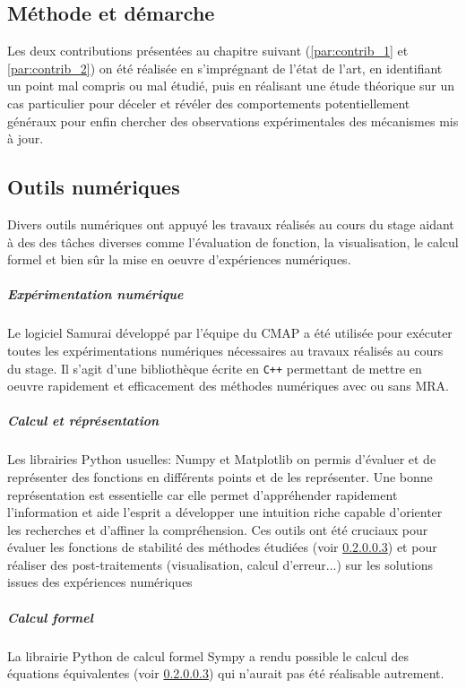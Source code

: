 \subsection{Méthode et démarche}
    Les deux contributions présentées au chapitre suivant (\ref{par:contrib_1} et \ref{par:contrib_2}) on été réalisée 
    en s'imprégnant de l'état de l'art, en identifiant un point mal compris ou mal étudié, puis
    en réalisant une étude théorique sur un cas particulier pour déceler et révéler des comportements potentiellement généraux
    pour enfin chercher des observations expérimentales des mécanismes mis à jour.
\subsection{Outils numériques}
    Divers outils numériques ont appuyé les travaux réalisés au cours du stage aidant à des des tâches diverses comme 
    l'évaluation de fonction, la visualisation, le calcul formel et bien sûr la mise en oeuvre d'expériences numériques.
    \subparagraph{Expérimentation numérique}
        Le logiciel Samurai développé par l'équipe du CMAP a été utilisée pour exécuter toutes les expérimentations numériques nécessaires 
        au travaux réalisés au cours du stage. Il s'agit d'une bibliothèque écrite en \texttt{C++} permettant de mettre en oeuvre 
        rapidement et efficacement des méthodes numériques avec ou sans MRA.
    \subparagraph{Calcul et réprésentation}
        Les librairies Python usuelles: Numpy et Matplotlib on permis d'évaluer et de représenter des fonctions en différents points et de 
        les représenter. Une bonne représentation est essentielle car elle permet d'appréhender rapidement l'information et aide l'esprit 
        a développer une intuition riche capable d'orienter les recherches et d'affiner la compréhension. 
        Ces outils ont été cruciaux pour évaluer les fonctions de stabilité des méthodes étudiées (voir \ref{}) et pour réaliser 
        des post-traitements (visualisation, calcul d'erreur...) sur les solutions issues des expériences numériques  
    \subparagraph{Calcul formel}
        La librairie Python de calcul formel Sympy a rendu possible le calcul des équations équivalentes (voir \ref{}) qui n'aurait pas 
        été réalisable autrement.